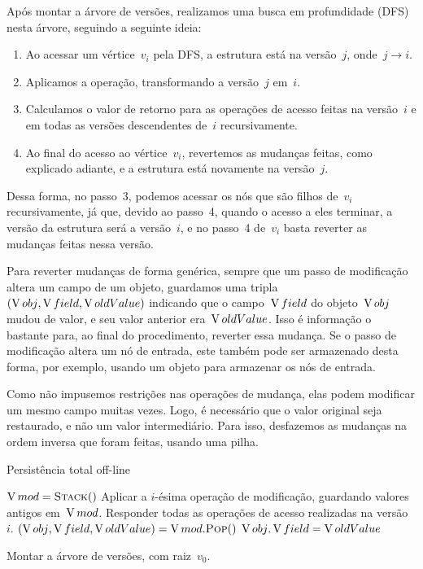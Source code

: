\documentclass[main.tex]{subfiles}
\begin{document}
Após montar a árvore de versões, realizamos uma busca em profundidade (DFS) nesta árvore, seguindo a seguinte ideia:
\begin{enumerate}
	\item Ao acessar um vértice~$v_i$ pela DFS, a estrutura está na versão~$j$, onde~$j \rightarrow i$.
	\item Aplicamos a operação, transformando a versão~$j$ em~$i$.
	\item Calculamos o valor de retorno para as operações de acesso feitas na versão~$i$ e em todas as versões descendentes de~$i$ recursivamente.
	\item Ao final do acesso ao vértice~$v_i$, revertemos as mudanças feitas, como explicado adiante, e a estrutura está novamente na versão~$j$.
\end{enumerate}

Dessa forma, no passo~3, podemos acessar os nós que são filhos de~$v_i$ recursivamente, já que, devido ao passo~4, quando o acesso a eles terminar, a versão da estrutura será a versão~$i$, e no passo~4 de~$v_i$ basta reverter as mudanças feitas nessa versão.

Para reverter mudanças de forma genérica, sempre que um passo de modificação altera um campo de um objeto, guardamos uma tripla~$(\operatorname{V}{obj}, \operatorname{V}{field}, \operatorname{V}{oldValue})$ indicando que o campo~$\operatorname{V}{field}$ do objeto~$\operatorname{V}{obj}$ mudou de valor, e seu valor anterior era~$\operatorname{V}{oldValue}$. Isso é informação o bastante para, ao final do procedimento, reverter essa mudança. Se o passo de modificação altera um nó de entrada, este também pode ser armazenado desta forma, por exemplo, usando um objeto para armazenar os nós de entrada.

Como não impusemos restrições nas operações de mudança, elas podem modificar um mesmo campo muitas vezes. Logo, é necessário que o valor original seja restaurado, e não um valor intermediário. Para isso, desfazemos as mudanças na ordem inversa que foram feitas, usando uma pilha.

\begin{algorithm}
\caption{Persistência total off-line} \label{lst:geraloffline}
\begin{algorithmic}[1]

	\State $\V{mod} = \Call{Stack}{\null}$
	\State Aplicar a $i$-ésima operação de modificação, guardando valores antigos em~$\operatorname{V}{mod}$.\label{line:off:opmod}
	\State Responder todas as operações de acesso realizadas na versão~$i$. \label{line:off:opac}
	 \label{line:off:for}
		\State {}
	\EndFor
	 \label{line:off:while}
		\State $(\V{obj}, \V{field}, \V{oldValue}) = \V{mod}.\Call{Pop}{\null}$
		\State $\operatorname{V}{obj}.\operatorname{V}{field} = \operatorname{V}{oldValue}$
	\EndWhile
\EndFunction

	\State Montar a árvore de versões, com raiz~$v_0$.
	\State {}
\EndFunction

\end{algorithmic}
\end{algorithm}
\end{document}
